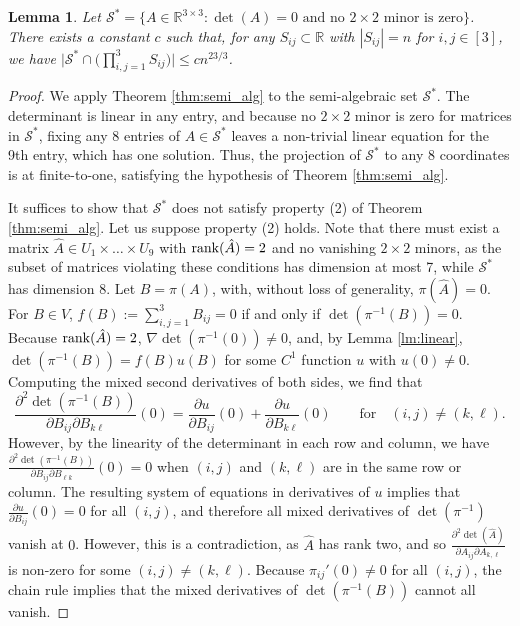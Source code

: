 \documentclass[reqno]{amsart}
\numberwithin{equation}{section}
\newcommand{\rank}{\mathop{\rm rank}}
\newtheorem{lemma}[theorem]{Lemma}
\begin{document}
\begin{lemma}\label{lm:det_grid}
Let $\mathcal{S}^* = \{A \in \mathbb{R}^{3 \times 3} : \det(A) = 0 \text{ and no } 2 \times 2 \text{ minor is zero}\}$. There exists a constant $c$ such that, for any $S_{ij} \subset \mathbb{R}$ with $|S_{ij}| = n$ for $i,j  \in [3]$, we have $\big|\mathcal{S}^* \cap \big(\prod_{i,j=1}^3 S_{ij} \big) \big| \le c n^{23/3}$.
\end{lemma}

\begin{proof}
We apply Theorem \ref{thm:semi_alg} to the semi-algebraic set $\mathcal{S}^*$. The determinant is linear in any entry, and because no $2 \times 2$ minor is zero for matrices in $\mathcal{S}^*$, fixing any 8 entries of $A \in \mathcal{S}^*$ leaves a non-trivial linear equation for the 9th entry, which has one solution. Thus, the projection of $\mathcal{S}^*$ to any 8 coordinates is at finite-to-one, satisfying the hypothesis of Theorem \ref{thm:semi_alg}.

It suffices to show that $\mathcal{S}^*$ does not satisfy property (2) of Theorem \ref{thm:semi_alg}. Let us suppose property (2) holds. Note that there must exist a matrix $\hat A \in U_1 \times \ldots \times U_9$ with $\rank( \hat A) = 2$ and no vanishing $2 \times 2$ minors, as the subset of matrices violating these conditions has dimension at most 7, while $\mathcal{S}^*$ has dimension 8. Let $B = \pi(A)$, with, without loss of generality, $\pi(\hat A) = 0$. For $B \in V$, $f(B) := \sum_{i,j = 1}^3 B_{ij} =0$ if and only if $\det(\pi^{-1}(B)) = 0$. Because $\rank( \hat A) = 2$, $\nabla \det(\pi^{-1}(0)) \ne 0$, and, by Lemma \ref{lm:linear}, $\det(\pi^{-1}(B)) = f(B) u(B)$ for some $C^1$ function $u$ with $u(0) \ne 0$. Computing the mixed second derivatives of both sides, we find that
\[\frac{\partial^2 \det(\pi^{-1}(B))}{\partial B_{ij} \partial B_{k\ell}} (0) = \frac{\partial u}{\partial B_{ij}}(0) + \frac{\partial u}{\partial B_{k \ell}}(0) \qquad \text{for} \quad (i,j) \ne (k,\ell).\]
However, by the linearity of the determinant in each row and column, we have $\frac{\partial^2 \det(\pi^{-1}(B))}{\partial B_{ij} \partial B_{\ell k}} (0) = 0$ when $(i,j)$ and $(k,\ell)$ are in the same row or column. The resulting system of equations in derivatives of $u$ implies that $\frac{\partial u}{\partial B_{ij}}(0) = 0$ for all $(i,j)$, and therefore all mixed derivatives of $\det(\pi^{-1})$ vanish at $0$. However, this is a contradiction, as $\hat A$ has rank two, and so $\frac{\partial^2 \det(\hat A)}{\partial A_{ij} \partial A_{k,\ell}}$ is non-zero for some $(i,j) \ne (k,\ell)$. Because $\pi_{ij}'(0) \ne 0$ for all $(i,j)$, the chain rule implies that the mixed derivatives of $\det(\pi^{-1}(B))$ cannot all vanish.
\end{proof}
\end{document}
